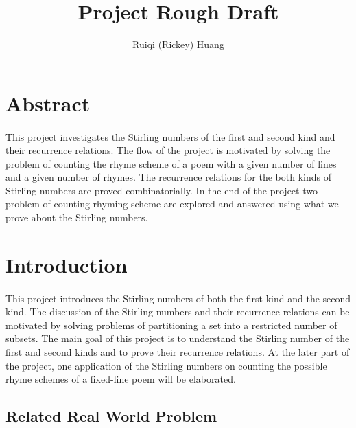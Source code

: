\documentclass{article}
\title{Project Rough Draft}
\author{Ruiqi (Rickey) Huang}
\theoremstyle{definition}
\theoremstyle{remark}
\theoremstyle{example}
\begin{document}
\maketitle

\section{Abstract}

\paragraph{  }

This project investigates the Stirling numbers of the first and second kind and their recurrence relations. The flow of the project is motivated by solving the problem of counting the rhyme scheme of a poem with a given number of lines and a given number of rhymes. The recurrence relations for the both kinds of Stirling numbers are proved combinatorially. In the end of the project two problem of counting rhyming scheme are explored and answered using what we prove about the Stirling numbers.

\section{Introduction}

\paragraph{   }

This project introduces the Stirling numbers of both the first kind and the second kind. The discussion of the Stirling numbers and their recurrence relations can be motivated by solving problems of partitioning a set into a restricted number of subsets. The main goal of this project is to understand the Stirling number of the first and second kinds and to prove their recurrence relations. At the later part of the project, one application of the Stirling numbers on counting the possible rhyme schemes of a fixed-line poem will be elaborated.

\subsection{Related Real World Problem \label{"rwProblems"}}
\paragraph{   }
\end{document}
